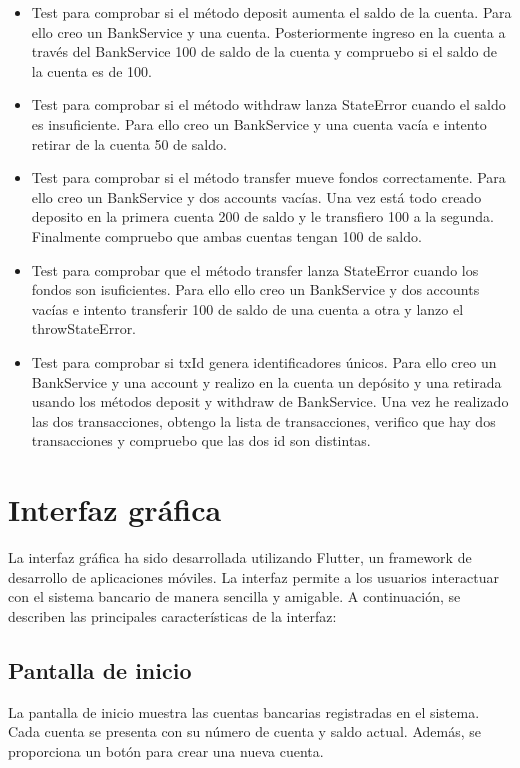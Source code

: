 \documentclass[12pt]{article}
\begin{document}
\begin{itemize}
\begin{itemize}
              \item Test para comprobar si el método deposit aumenta el saldo de la cuenta. Para ello creo un BankService y una cuenta. Posteriormente ingreso en la cuenta a través del BankService 100 de saldo de la cuenta y compruebo si el saldo de la cuenta es de 100.
              \item Test para comprobar si el método withdraw lanza StateError cuando el saldo es insuficiente.
                    Para ello creo un BankService y una cuenta vacía e intento retirar de la cuenta 50 de saldo.
              \item Test para comprobar si el método transfer mueve fondos correctamente. Para ello creo un BankService y dos accounts vacías. Una vez está todo creado deposito en la primera cuenta 200 de saldo y le transfiero 100 a la segunda. Finalmente compruebo que ambas cuentas tengan 100 de saldo.
              \item Test para comprobar que el método transfer lanza StateError cuando los fondos son isuficientes. Para ello ello creo un BankService y dos accounts vacías e intento transferir 100 de saldo de una cuenta a otra y lanzo el throwStateError.
              \item Test para comprobar si txId genera identificadores únicos. Para ello creo un BankService y una account y realizo en la cuenta un depósito y una retirada usando los métodos deposit y withdraw de BankService. Una vez he realizado las dos transacciones, obtengo la lista de transacciones, verifico que hay dos transacciones y compruebo que las dos id son distintas.
          \end{itemize}
\end{itemize}

\section{Interfaz gráfica}

La interfaz gráfica ha sido desarrollada utilizando Flutter, un framework de desarrollo de aplicaciones móviles. La interfaz permite a los usuarios interactuar con el sistema bancario de manera sencilla y amigable. A continuación, se describen las principales características de la interfaz:

\subsection{Pantalla de inicio}

La pantalla de inicio muestra las cuentas bancarias registradas en el sistema. Cada cuenta se presenta con su número de cuenta y saldo actual. Además, se proporciona un botón para crear una nueva cuenta.
\end{document}
